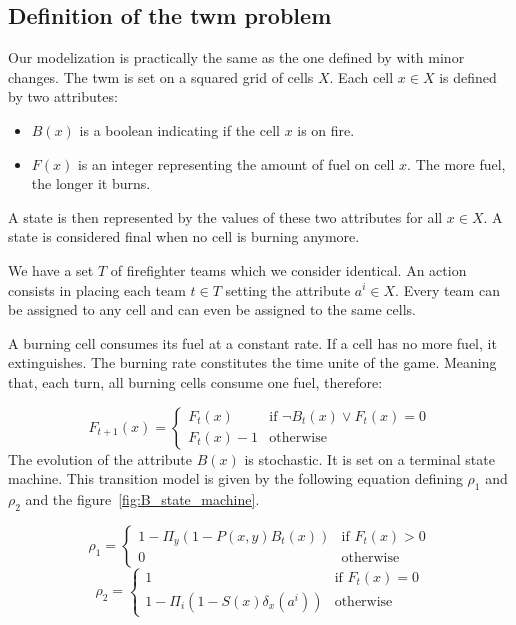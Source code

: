 \subsection{Definition of the \acrshort{twm} problem}%
\label{sub:definition_of_the_twm_problem}

Our modelization is practically the same as the one defined by \citeauthor{comp_mcts_mo}\cite{comp_mcts_mo} with minor changes.
The \gls{twm} is set on a squared grid of cells \(X\).
Each cell \(x \in X\) is defined by two attributes:

\begin{itemize}
    \item \(B(x)\) is a boolean indicating if the cell \(x\) is on fire.
    \item \(F(x)\) is an integer representing the amount of fuel on cell \(x\). The more fuel, the longer it burns.
\end{itemize}

A state is then represented by the values of these two attributes for all \(x \in X\).
A state is considered final when no cell is burning anymore.

We have a set \(T\) of firefighter teams which we consider identical.
An action consists in placing each team \(t \in T\) setting the attribute \(a^{i} \in X\).
Every team can be assigned to any cell and can even be assigned to the same cells.

A burning cell consumes its fuel at a constant rate.
If a cell has no more fuel, it extinguishes.
The burning rate constitutes the time unite of the game. 
Meaning that, each turn, all burning cells consume one fuel, therefore:

\[
    F_{t+1}(x) = 
    \begin{cases}
        F_{t}(x)& \text{if } \lnot B_{t}(x) \lor F_{t}(x) = 0\\
        F_{t}(x) - 1& \text{otherwise }
    \end{cases}
\]
The evolution of the attribute \(B(x)\) is stochastic.
It is set on a terminal state machine.
This transition model is given by the following equation defining \(\rho_{1}\) and \(\rho_{2}\) and the figure~\ref{fig:B_state_machine}.

\[
    \rho_{1} = 
    \begin{cases}
        1 - \Pi_{y}(1 - P(x, y)B_{t}(x))& \text{if } F_{t}(x) > 0\\
        0& \text{otherwise }
    \end{cases}
\]
\[
    \rho_{2} = 
    \begin{cases}
        1& \text{if } F_{t}(x) = 0\\
        1 - \Pi_{i}(1 - S(x)\delta_{x}(a^{i}))& \text{otherwise }
    \end{cases}
\]

